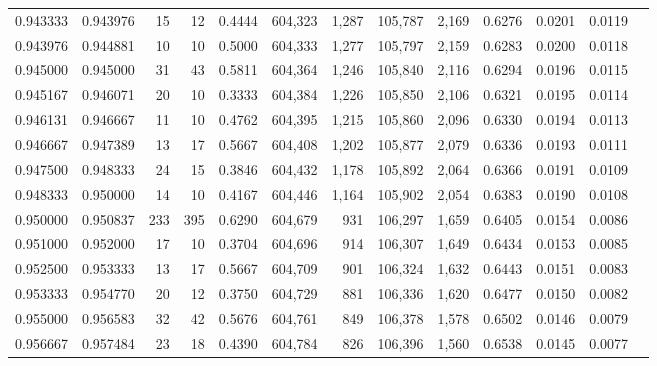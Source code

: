 \begin{tabular}{rrrrrrrrrrrrr}
0.943333 & 0.943976 &    15 &  12 &                                     0.4444 & 604,323 &   1,287 & 105,787 &   2,169 & 0.6276 & 0.0201 & 0.0119 \\
0.943976 & 0.944881 &    10 &  10 &                                     0.5000 & 604,333 &   1,277 & 105,797 &   2,159 & 0.6283 & 0.0200 & 0.0118 \\
0.945000 & 0.945000 &    31 &  43 &                                     0.5811 & 604,364 &   1,246 & 105,840 &   2,116 & 0.6294 & 0.0196 & 0.0115 \\
0.945167 & 0.946071 &    20 &  10 &                                     0.3333 & 604,384 &   1,226 & 105,850 &   2,106 & 0.6321 & 0.0195 & 0.0114 \\
0.946131 & 0.946667 &    11 &  10 &                                     0.4762 & 604,395 &   1,215 & 105,860 &   2,096 & 0.6330 & 0.0194 & 0.0113 \\
0.946667 & 0.947389 &    13 &  17 &                                     0.5667 & 604,408 &   1,202 & 105,877 &   2,079 & 0.6336 & 0.0193 & 0.0111 \\
0.947500 & 0.948333 &    24 &  15 &                                     0.3846 & 604,432 &   1,178 & 105,892 &   2,064 & 0.6366 & 0.0191 & 0.0109 \\
0.948333 & 0.950000 &    14 &  10 &                                     0.4167 & 604,446 &   1,164 & 105,902 &   2,054 & 0.6383 & 0.0190 & 0.0108 \\
0.950000 & 0.950837 &   233 & 395 &                                     0.6290 & 604,679 &     931 & 106,297 &   1,659 & 0.6405 & 0.0154 & 0.0086 \\
0.951000 & 0.952000 &    17 &  10 &                                     0.3704 & 604,696 &     914 & 106,307 &   1,649 & 0.6434 & 0.0153 & 0.0085 \\
0.952500 & 0.953333 &    13 &  17 &                                     0.5667 & 604,709 &     901 & 106,324 &   1,632 & 0.6443 & 0.0151 & 0.0083 \\
0.953333 & 0.954770 &    20 &  12 &                                     0.3750 & 604,729 &     881 & 106,336 &   1,620 & 0.6477 & 0.0150 & 0.0082 \\
0.955000 & 0.956583 &    32 &  42 &                                     0.5676 & 604,761 &     849 & 106,378 &   1,578 & 0.6502 & 0.0146 & 0.0079 \\
0.956667 & 0.957484 &    23 &  18 &                                     0.4390 & 604,784 &     826 & 106,396 &   1,560 & 0.6538 & 0.0145 & 0.0077 \\

\end{tabular}
